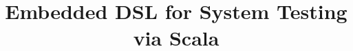 \documentclass[12pt]{article}
\begin{document}
\title{Embedded DSL for System Testing via Scala}


\maketitle
\onehalfspacing
\vspace{-10 mm}
\tableofcontents
\newpage

% 
% 
% 


\end{document}
